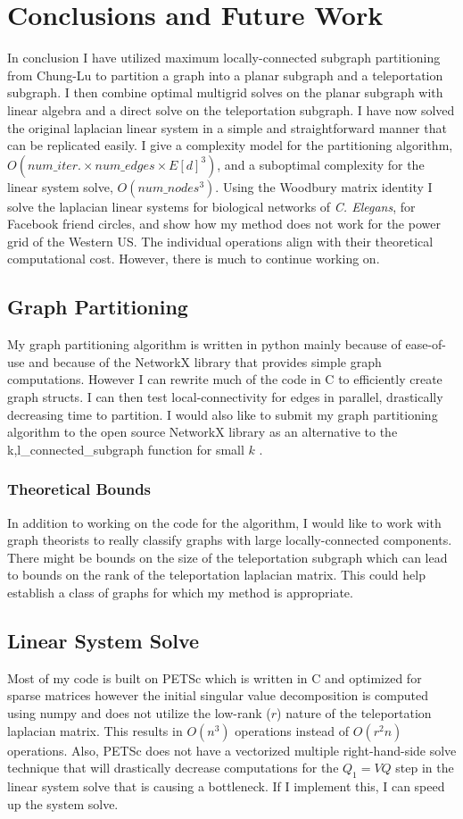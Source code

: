 \documentclass{article}
\begin{document}
\section{Conclusions and Future Work}
In conclusion I have utilized maximum locally-connected subgraph partitioning from Chung-Lu to partition a graph into a planar subgraph and a teleportation subgraph. I then combine optimal multigrid solves on the planar subgraph with linear algebra and a direct solve on the teleportation subgraph. I have now solved the original laplacian linear system in a simple and straightforward manner that can be replicated easily. I give a complexity model for the partitioning algorithm, $O(num\_iter. \times num\_edges \times E[d]^3)$, and a suboptimal complexity for the linear system solve, $O(num\_nodes^3)$. Using the Woodbury matrix identity \cite{Woodbury:1950} I solve the laplacian linear systems for biological networks of \textit{C. Elegans}, for Facebook friend circles, and show how my method does not work for the power grid of the Western US. The individual operations align with their theoretical computational cost. However, there is much to continue working on.

\subsection{Graph Partitioning}
My graph partitioning algorithm is written in python mainly because of ease-of-use and because of the NetworkX library that provides simple graph computations. However I can rewrite much of the code in C to efficiently create graph structs. I can then test local-connectivity for edges in parallel, drastically decreasing time to partition. I would also like to submit my graph partitioning algorithm to the open source NetworkX library as an alternative to the k,l\_connected\_subgraph function for small $k$ \cite{Hagberg:2008}.
\subsubsection{Theoretical Bounds}
In addition to working on the code for the algorithm, I would like to work with graph theorists to really classify graphs with large locally-connected components. There might be bounds on the size of the teleportation subgraph which can lead to bounds on the rank of the teleportation laplacian matrix. This could help establish a class of graphs for which my method is appropriate.

\subsection{Linear System Solve}
Most of my code is built on PETSc which is written in C and optimized for sparse matrices \cite{petsc-user-ref} however the initial singular value decomposition is computed using numpy and does not utilize the low-rank ($r$) nature of the teleportation laplacian matrix. This results in $O(n^3)$ operations instead of $O(r^{2}n)$ operations. Also, PETSc does not have a vectorized multiple right-hand-side solve technique that will drastically decrease computations for the $Q_1 = VQ$ step in the linear system solve that is causing a bottleneck. If I implement this, I can speed up the system solve.
\end{document}
